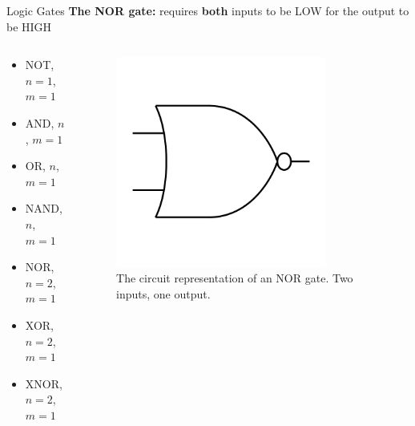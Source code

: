 \documentclass{beamer}
\begin{document}
\begin{frame}{Logic Gates}
\textbf{The NOR gate:} requires \textbf{both} inputs to be LOW for the output to be HIGH \\ \vspace{0.5cm}
\begin{columns}[T]
\begin{column}{0.5\textwidth}
\begin{itemize}
\item \alert{NOT, $n=1$, $m=1$}
\item \alert{AND, $n$, $m=1$}
\item \alert{OR, $n$, $m=1$}
\item \alert{NAND, $n$, $m=1$}
\item \alert{NOR, $n=2$, $m=1$}
\item XOR, $n=2$, $m=1$
\item XNOR, $n=2$, $m=1$
\end{itemize}
\end{column}
\begin{column}{0.5\textwidth}
\begin{figure}
\centering
\includegraphics[width=0.8\textwidth,trim=0cm 2cm 0cm 2cm,clip=true]{figures/BasicNOR.pdf}
\caption{\label{fig:nor} The circuit representation of an NOR gate.  Two inputs, one output.}
\end{figure}
\end{column}
\end{columns}
\end{frame}
\end{document}
